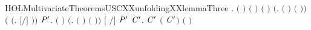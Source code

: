 \newcommand{\HOLMultivariateTheoremsUSCXXunfoldingXXlemmaTwo}{\UseVerbatim{HOLMultivariateTheoremsUSCXXunfoldingXXlemmaTwo}}
\begin{SaveVerbatim}{HOLMultivariateTheoremsUSCXXunfoldingXXlemmaThree}
\HOLTokenTurnstile{} \HOLSymConst{\HOLTokenForall{}}   .
         \HOLSymConst{\HOLTokenConj{}}    \HOLSymConst{\HOLTokenConj{}}
        \ensuremath{(} \ensuremath{)} \ensuremath{(} \ensuremath{)} \HOLSymConst{\HOLTokenConj{}} \ensuremath{(}  \HOLSymConst{\ensuremath{=}}  \ensuremath{)} \HOLSymConst{\HOLTokenConj{}}
          \HOLSymConst{\HOLTokenConj{}}
        \ensuremath{(}\HOLTokenLambda{}.  \ensuremath{(} \ensuremath{)} \ensuremath{(} \ensuremath{)}\ensuremath{)}  \HOLSymConst{\HOLTokenConj{}}
       \ensuremath{(} \HOLSymConst{\ensuremath{=}} \ensuremath{(}\HOLTokenLambda{}.  \ensuremath{[}\ensuremath{/}\ensuremath{]} \ensuremath{)}\ensuremath{)} \HOLSymConst{\HOLTokenImp{}}
       \HOLSymConst{\HOLTokenForall{}}  \ensuremath{\HOLBoundVar{P}\sp{\prime}}.
           \ensuremath{(}  \HOLSymConst{\ensuremath{=}}  \ensuremath{)} \HOLSymConst{\HOLTokenConj{}}   \HOLSymConst{\HOLTokenConj{}}
            \ensuremath{(}\HOLTokenLambda{}.  \ensuremath{(} \ensuremath{)} \ensuremath{(} \ensuremath{)}\ensuremath{)}  \HOLSymConst{\HOLTokenConj{}}
           \ensuremath{[} \ensuremath{/}\ensuremath{]}  \HOLTokenTransBegin{}\HOLTokenTransEnd \ensuremath{\HOLBoundVar{P}\sp{\prime}} \HOLSymConst{\HOLTokenImp{}}
           \HOLSymConst{\HOLTokenExists{}}\ensuremath{\HOLBoundVar{C}\sp{\prime}}.
                 \ensuremath{\HOLBoundVar{C}\sp{\prime}} \HOLSymConst{\HOLTokenConj{}}  \ensuremath{(} \ensuremath{\HOLBoundVar{C}\sp{\prime}}\ensuremath{)} \ensuremath{(} \ensuremath{)} \HOLSymConst{\HOLTokenConj{}}

\end{SaveVerbatim}

